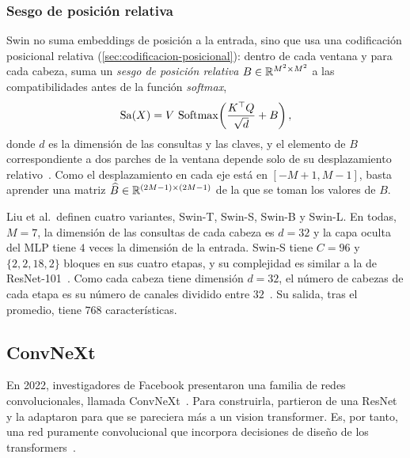 \subsubsection{Sesgo de posición relativa}

Swin no suma embeddings de posición a la entrada, sino que usa una codificación
posicional relativa (\cref{sec:codificacion-posicional}): dentro de cada ventana
y para cada cabeza, suma un \emph{sesgo de posición relativa}
$B\in\mathbb{R}^{M^2\times M^2}$ a las compatibilidades antes de la función
\emph{softmax},
\[
  \operatorname{Sa}(X) = V\,\operatorname{Softmax}\!\left(\frac{K^{\top}Q}{\sqrt{d}} + B\right),
\]
donde $d$ es la dimensión de las consultas y las claves, y el elemento de $B$
correspondiente a dos parches de la ventana depende solo de su desplazamiento
relativo~\cite[ec.~(4)]{liu2021swin}. Como el desplazamiento en cada eje está en
$[-M+1, M-1]$, basta aprender una matriz $\widehat{B}\in\mathbb{R}^{(2M-1)\times(2M-1)}$
de la que se toman los valores de $B$.

Liu et al.\ definen cuatro variantes, Swin-T, Swin-S, Swin-B y Swin-L. En todas,
$M = 7$, la dimensión de las consultas de cada cabeza es $d = 32$ y la capa
oculta del MLP tiene $4$ veces la dimensión de la entrada. Swin-S tiene $C = 96$
y $\{2, 2, 18, 2\}$ bloques en sus cuatro etapas, y su complejidad es similar a la
de ResNet-101~\cite[sec.~3.3]{liu2021swin}. Como cada cabeza tiene dimensión $d = 32$, el
número de cabezas de cada etapa es su número de canales dividido entre
$32$~\cite[sec.~3.3]{liu2021swin}. Su salida, tras el promedio, tiene $768$
características.

\subsection{ConvNeXt}\label{sec:convnext}


En 2022, investigadores de Facebook presentaron una familia de redes
convolucionales, llamada ConvNeXt~\cite{liu2022convnext,todi2023convnext}. Para construirla, partieron de
una ResNet y la adaptaron para que se pareciera más a un vision
transformer. Es, por tanto, una red puramente convolucional que incorpora decisiones de diseño de los
transformers~\cite{todi2023convnext}.

